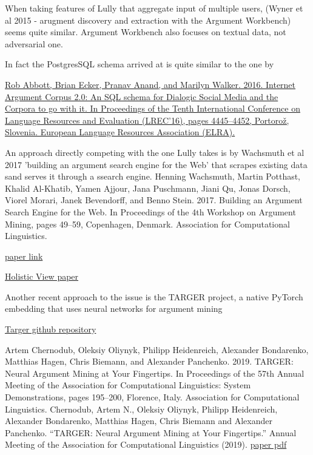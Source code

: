 \documentclass{article}
\begin{document}
When taking features of Lully that aggregate input of multiple users, (Wyner et al 2015 - arugment discovery and extraction with the Argument Workbench) seems quite similar. Argument Workbench also focuses on textual data, not adversarial one. 

In fact the PostgresSQL schema arrived at is quite similar to the one by 

\href{ https://aclanthology.org/L16-1704/ }{ Rob Abbott, Brian Ecker, Pranav Anand, and Marilyn Walker. 2016. Internet Argument Corpus 2.0: An SQL schema for Dialogic Social Media and the Corpora to go with it. In Proceedings of the Tenth International Conference on Language Resources and Evaluation (LREC'16), pages 4445–4452, Portorož, Slovenia. European Language Resources Association (ELRA).  }

An approach directly competing with the one Lully takes is by Wachsmuth et al 2017 'building an argument search engine for the Web' that scrapes existing data sand serves it through a ssearch engine.
Henning Wachsmuth, Martin Potthast, Khalid Al-Khatib, Yamen Ajjour, Jana Puschmann, Jiani Qu, Jonas Dorsch, Viorel Morari, Janek Bevendorff, and Benno Stein. 2017. Building an Argument Search Engine for the Web. In Proceedings of the 4th Workshop on Argument Mining, pages 49–59, Copenhagen, Denmark. Association for Computational Linguistics.

\href{ https://aclanthology.org/W17-5106.pdf }{paper link}

\href{https://www.semanticscholar.org/paper/Towards-a-Holistic-View-on-Argument-Quality-Fromm-Berrendorf/660fcd097881e7388f91b3724cdb0e2aeb9ff688}{Holistic View paper}

Another recent approach to the issue is the TARGER project, a native PyTorch embedding that uses neural networks for argument mining

\href{https://github.com/achernodub/targer}{Targer github repository}

Artem Chernodub, Oleksiy Oliynyk, Philipp Heidenreich, Alexander Bondarenko, Matthias Hagen, Chris Biemann, and Alexander Panchenko. 2019. TARGER: Neural Argument Mining at Your Fingertips. In Proceedings of the 57th Annual Meeting of the Association for Computational Linguistics: System Demonstrations, pages 195–200, Florence, Italy. Association for Computational Linguistics.
Chernodub, Artem N., Oleksiy Oliynyk, Philipp Heidenreich, Alexander Bondarenko, Matthias Hagen, Chris Biemann and Alexander Panchenko. “TARGER: Neural Argument Mining at Your Fingertips.” Annual Meeting of the Association for Computational Linguistics (2019).
\href{https://aclanthology.org/P19-3031/}{paper pdf}
\end{document}
